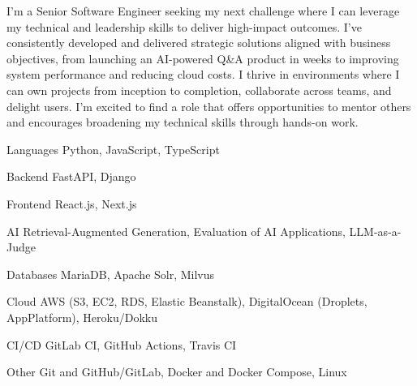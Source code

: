 \documentclass[11pt, a4paper]{awesome-cv}
\begin{document}
\makecvheader[C]




\begin{cvparagraph}
  I'm a Senior Software Engineer seeking my next challenge where I can leverage my technical and leadership skills to deliver high-impact outcomes. I've consistently developed and delivered strategic solutions aligned with business objectives, from launching an AI-powered Q\&A product in weeks to improving system performance and reducing cloud costs. I thrive in environments where I can own projects from inception to completion, collaborate across teams, and delight users. I'm excited to find a role that offers opportunities to mentor others and encourages broadening my technical skills through hands-on work.
\end{cvparagraph}



\begin{cvskills}

  \cvskill
    {Languages}
    {Python, JavaScript, TypeScript}

  \cvskill
    {Backend}
    {FastAPI, Django}

  \cvskill
    {Frontend}
    {React.js, Next.js}

  \cvskill
    {AI}
    {Retrieval-Augmented Generation, Evaluation of AI Applications, LLM-as-a-Judge}

  \cvskill
    {Databases}
    {MariaDB, Apache Solr, Milvus}

  \cvskill
    {Cloud}
    {AWS (S3, EC2, RDS, Elastic Beanstalk), DigitalOcean (Droplets, AppPlatform), Heroku/Dokku}

  \cvskill
    {CI/CD}
    {GitLab CI, GitHub Actions, Travis CI}

  \cvskill
    {Other}
    {Git and GitHub/GitLab, Docker and Docker Compose, Linux}

\end{cvskills}
\end{document}
